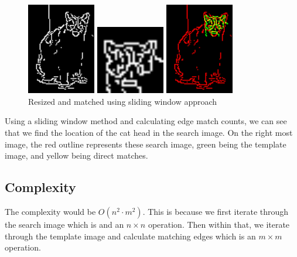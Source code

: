 \documentclass[12p,letterpaper]{article}
\begin{document}
			\begin{figure}[h]
				\centering
				\begin{minipage}{0.25\textwidth}
					\includegraphics[width=3cm]{images/search_im.PNG}
				\end{minipage}
				\begin{minipage}{0.25\textwidth}
					\includegraphics[width=3cm]{images/template_im.PNG}
				\end{minipage}
				\begin{minipage}{0.25\textwidth}
					\includegraphics[width=3cm]{images/matches.PNG}
				\end{minipage}
				\caption{Resized and matched using sliding window approach}
			\end{figure}

			Using a sliding window method and calculating edge match
			counts, we can see that we find the location of the cat head in the
			search image. On the right most image, the red outline represents these
			search image, green being the template image, and yellow being direct
			matches.

		\subsection{Complexity}

			The complexity would be $O(n^{2} \cdot m^{2})$. This is because we first iterate
			through the search image which is and an $n \times n$ operation. Then within that, we
			iterate through the template image and calculate matching edges which is an $m \times m$
			operation.
\end{document}
